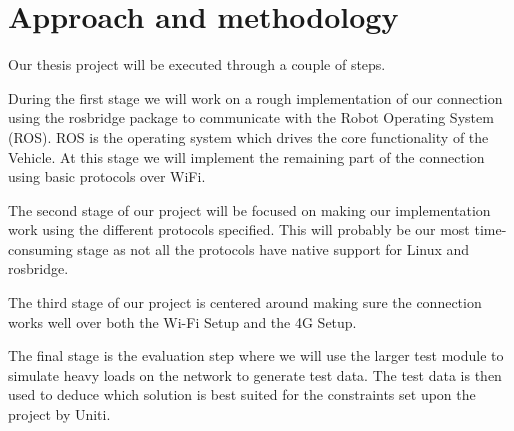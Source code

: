 \documentclass[a4paper]{article}
\begin{document}
\section{Approach and methodology}


Our thesis project will be executed through a couple of steps.

During the first stage we will work on a rough implementation of our connection
using the rosbridge package to communicate with the Robot Operating System
(ROS). ROS is the operating system which drives the core functionality of the 
Vehicle. At this stage we will implement the remaining part of the connection
using basic protocols over WiFi.

The second stage of our project will be focused on making our implementation 
work using the different protocols specified. This will probably be our most 
time-consuming stage as not all the protocols have native support for Linux and
rosbridge.

The third stage of our project is centered around making sure the connection 
works well over both the Wi-Fi Setup and the 4G Setup.

The final stage is the evaluation step where we will use the larger test module
to simulate heavy loads on the network to generate test data. The test data is
then used to deduce which solution is best suited for the constraints set upon
the project by Uniti.




\end{document}
